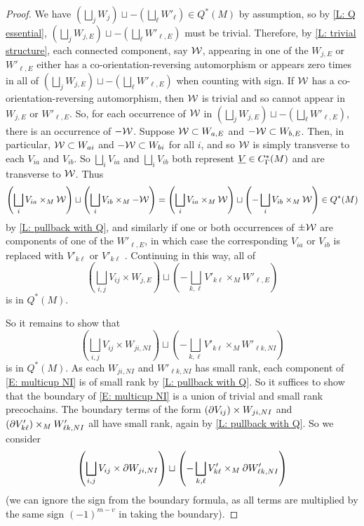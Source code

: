 \begin{proof}
	We have $\left(\bigsqcup_j W_{j}\right) \sqcup -\left(\bigsqcup_\ell W'_{\ell}\right) \in Q^*(M)$ by assumption, so by \cref{L: Q essential}, $\left(\bigsqcup_j W_{j,E}\right) \sqcup -\left(\bigsqcup_\ell W'_{\ell,E}\right)$ must be trivial.
	Therefore, by \cref{L: trivial structure}, each connected component, say $\mathcal{W}$, appearing in one of the $W_{j,E}$ or $W'_{\ell, E}$ either has a co-orientation-reversing automorphism or appears zero times in all of $\left(\bigsqcup_j W_{j,E}\right) \sqcup -\left(\bigsqcup_\ell W'_{\ell,E}\right)$ when counting with sign.
	If $\mathcal{W}$ has a co-orientation-reversing automorphism, then $\mathcal{W}$ is trivial and so cannot appear in $W_{j,E}$ or $W'_{\ell,E}$.
	So, for each occurrence of $\mathcal{W}$ in $\left(\bigsqcup_j W_{j,E}\right) \sqcup -\left(\bigsqcup_\ell W'_{\ell,E}\right)$, there is an occurrence of $-\mathcal{W}$.
	Suppose $\mathcal{W} \subset W_{a,E}$ and $-\mathcal{W} \subset W_{b,E}$.
	Then, in particular, $\mathcal{W} \subset W_{ai}$ and $-\mathcal{W} \subset W_{bi}$ for all $i$, and so $\mathcal{W}$ is simply transverse to each $V_{ia}$ and $V_{ib}$.
	So $\bigsqcup_i V_{ia}$ and $\bigsqcup_i V_{ib}$ both represent $\underline{V} \in C^*_\Gamma(M)$ and are transverse to $\mathcal{W}$.
	Thus
	$$\left(\bigsqcup_i V_{ia} \times_M \mathcal{W}\right) \sqcup \left(\bigsqcup_i V_{ib} \times_M -\mathcal{W}\right) = \left(\bigsqcup_i V_{ia} \times_M \mathcal{W}\right) \sqcup \left(-\bigsqcup_i V_{ib} \times_M \mathcal{W}\right) \in Q^*(M)$$
	by \cref{L: pullback with Q}, and similarly if one or both occurrences of $\pm \mathcal{W}$ are components of one of the $W'_{\ell, E}$, in which case the corresponding $V_{ia}$ or $V_{ib}$ is replaced with $V'_{k\ell}$ or $V'_{k\ell}$ .
	Continuing in this way, all of $$\left(\bigsqcup_{i,j} V_{ij} \times W_{j,E}\right) \sqcup \left(-\bigsqcup_{k,\ell} V'_{k\ell} \times_M W'_{\ell,E}\right)$$
	is in $Q^*(M)$.

	So it remains to show that
	\begin{equation}\label{E: multicup NI}
		\left(\bigsqcup_{i,j} V_{ij} \times W_{ji,NI} \right) \sqcup \left(- \bigsqcup_{k,\ell} V'_{k\ell} \times_M W'_{\ell k,NI}\right)
	\end{equation}
	is in $Q^*(M)$.
	As each $W_{ji,NI}$ and $W'_{\ell k,NI}$ has small rank, each component of \eqref{E: multicup NI} is of small rank by \cref{L: pullback with Q}.
	So it suffices to show that the boundary of \eqref{E: multicup NI} is a union of trivial and small rank precochains.
	The boundary terms of the form $(\partial V_{ij}) \times W_{ji,NI}$ and $(\partial V'_{k\ell}) \times_M W'_{\ell k,NI}$ all have small rank, again by \cref{L: pullback with Q}.
	So we consider
	$$\left(\bigsqcup_{i,j} V_{ij} \times \partial W_{ji,NI} \right) \sqcup \left(-\bigsqcup_{k,\ell} V'_{k\ell} \times_M \partial W'_{\ell k,NI}\right)$$
	(we can ignore the sign from the boundary formula, as all terms are multiplied by the same sign $(-1)^{m-v}$ in taking the boundary).


\end{proof}
